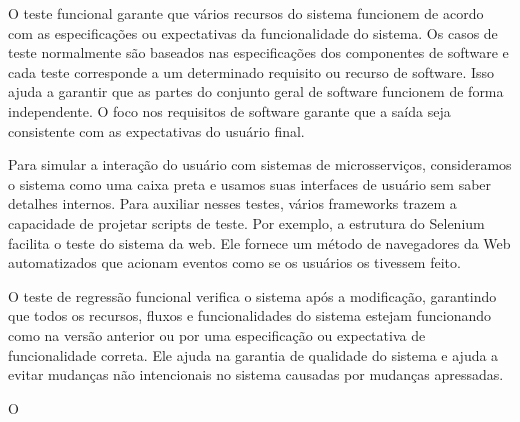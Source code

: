 


O teste funcional garante que vários recursos do sistema funcionem de acordo com as especificações ou expectativas da funcionalidade do sistema. Os casos de teste normalmente são baseados nas especificações dos componentes de software e cada teste corresponde a um determinado requisito ou recurso de software. Isso ajuda a garantir que as partes do conjunto geral de software funcionem de forma independente. O foco nos requisitos de software garante que a saída seja consistente com as expectativas do usuário final.

Para simular a interação do usuário com sistemas de microsserviços, consideramos o sistema como uma caixa preta e usamos suas interfaces de usuário sem saber detalhes internos. Para auxiliar nesses testes, vários frameworks trazem a capacidade de projetar scripts de teste. Por exemplo, a estrutura do Selenium facilita o teste do sistema da web. Ele fornece um método de navegadores da Web automatizados que acionam eventos como se os usuários os tivessem feito.

O teste de regressão funcional verifica o sistema após a modificação, garantindo que todos os recursos, fluxos e funcionalidades do sistema estejam funcionando como na versão anterior ou por uma especificação ou expectativa de funcionalidade correta. Ele ajuda na garantia de qualidade do sistema e ajuda a evitar mudanças não intencionais no sistema causadas por mudanças apressadas.

O %

